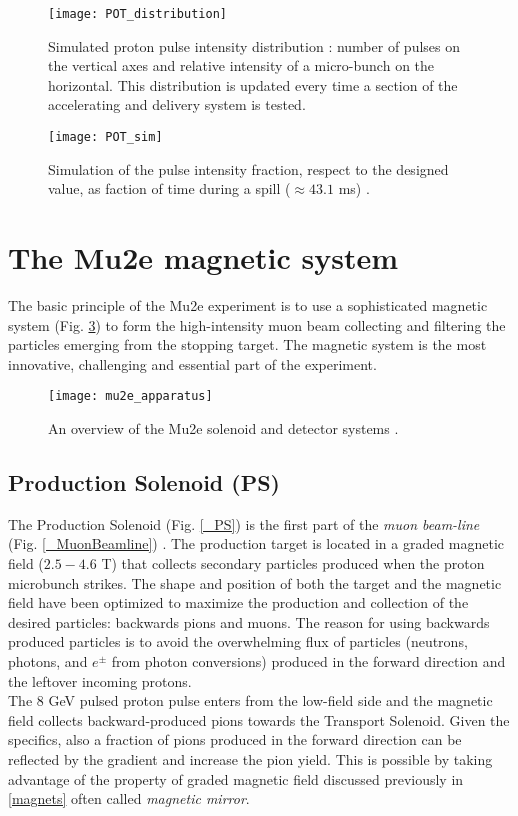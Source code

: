 \documentclass[12pt,a4paper,openright, oneside, titlepage]{book} %
\begin{document}
\begin{figure}[h!]
\centering
\texttt{[image: POT\_distribution]}
\caption{Simulated proton pulse intensity distribution \cite{SpillSim}: number of pulses on the vertical axes and relative intensity of a micro-bunch on the horizontal. 
This distribution is updated every time a section of the accelerating and delivery system is tested.}
\label{_POT_distribution}
\end{figure}

\begin{figure}[h!]
\centering
\texttt{[image: POT\_sim]}
\caption{Simulation of the pulse intensity fraction, 
respect to the designed value, as faction of time during a spill ($\approx 43.1$ ms) \cite{SpillSim}.}
\label{_POT_sim}
\end{figure}

\section{The Mu2e magnetic system}
The basic principle of the Mu2e experiment is to use a sophisticated magnetic system (Fig. \ref{_mu2e_apparatus_pre}) to form the high-intensity muon beam collecting and filtering the particles emerging from the stopping target. The magnetic system is the most innovative, challenging and essential part of the experiment. 

\begin{figure}[h!]
\centering
\texttt{[image: mu2e\_apparatus]}\\
\caption{An overview of the Mu2e solenoid and detector systems \cite{Giovannella}.}
\label{_mu2e_apparatus_pre}
\end{figure}


\subsection{Production Solenoid (PS)}
The Production Solenoid (Fig. \ref{_PS}) is the first part of the \textit{muon beam-line} (Fig. \ref{_MuonBeamline}) \cite{PS}. 
The production target is located in a graded magnetic field ($2.5 - 4.6$ T) that collects secondary particles produced when the proton microbunch strikes. The shape and position of both the target and the magnetic field have been optimized to maximize the production and collection of the desired particles: backwards pions and muons. 
The reason for using backwards produced particles is to avoid the overwhelming flux of particles (neutrons, photons, and $e^\pm$ from photon conversions) produced in the forward direction and the leftover incoming protons.\\
The 8 GeV pulsed proton pulse enters from the low-field side and the magnetic field collects backward-produced pions towards the Transport Solenoid. 
Given the specifics, also a fraction of pions produced in the forward direction can be reflected by the gradient and  increase the pion yield. 
This is possible by taking advantage of the property of graded magnetic field discussed previously in \ref{magnets} often called \textit{magnetic mirror}.
\end{document}
